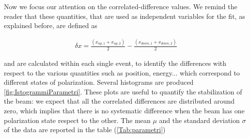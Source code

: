 \begin{figure}[hbtp]
\centering
{}
\end{figure}

Now we focus our attention on the correlated-difference values. We remind the reader that these quantities, that are used as independent variables for the fit, as explained before, are defined as 

\begin{align*}
\delta x =  \frac{(x_{up,1} + x_{up,2})}{2} - \frac{(x_{down,1} + x_{down,2})}{2}
\end{align*}

and are calculated within each single event, to identify the differences with respect to the various quantities such as position, energy... which correspond to different states of polarization.
Several histograms are produced \ref{fig:IstogrammiParametri}. These plots are useful to quantify the stabilization of the beam: we expect that all the correlated differences are distributed around zero, which implies that there is no systematic difference when the beam has one polarization state respect to the other. The mean $\mu$ and the standard deviation $\sigma$ of the data are reported in the table (\ref{Tab:parametri}) 

